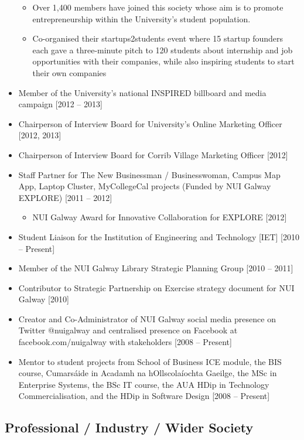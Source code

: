 \documentclass[10pt,a4paper]{res} %
\begin{document}
\begin{resume}
\begin{itemize}
\begin{itemize} \itemsep -2pt
\item Over 1,400 members have joined this society whose aim is to promote entrepreneurship within the University's student population.
\item Co-organised their startups2students event where 15 startup founders each gave a three-minute pitch to 120 students about internship and job opportunities with their companies, while also inspiring students to start their own companies
\end{itemize}
\item Member of the University's national INSPIRED billboard and media campaign [2012 -- 2013] 
\item Chairperson of Interview Board for University's Online Marketing Officer [2012, 2013]
\item Chairperson of Interview Board for Corrib Village Marketing Officer [2012]
\item Staff Partner for The New Businessman / Businesswoman, Campus Map App, Laptop Cluster, MyCollegeCal projects (Funded by NUI Galway EXPLORE) [2011 -- 2012]
\begin{itemize} \itemsep -2pt
\item NUI Galway Award for Innovative Collaboration for EXPLORE [2012]
\end{itemize}
\item Student Liaison for the Institution of Engineering and Technology [IET] [2010 -- Present]
\item Member of the NUI Galway Library Strategic Planning Group [2010 -- 2011]
\item Contributor to Strategic Partnership on Exercise strategy document for NUI Galway [2010]
\item Creator and Co-Administrator of NUI Galway social media presence on Twitter @nuigalway and centralised presence on Facebook at facebook.com/nuigalway with stakeholders [2008 -- Present]
\item Mentor to student projects from School of Business ICE module, the BIS course, Cumars\'{a}ide in Acadamh na hOllscola\'{i}ochta Gaeilge, the MSc in Enterprise Systems, the BSc IT course, the AUA HDip in Technology Commercialisation, and the HDip in Software Design [2008 -- Present]
\end{itemize}

\subsection*{Professional / Industry / Wider Society}


\end{resume}
\end{document}
